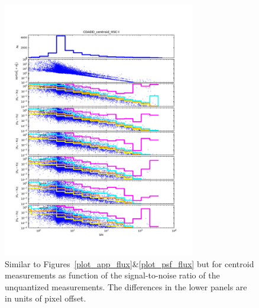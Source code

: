 \begin{figure}
\centering
\includegraphics[width=0.75\textwidth]{figure/plot_coadd_centroid_HSC-I.png}
\caption{Similar to Figures~\ref{plot_app_flux}\&\ref{plot_psf_flux} but for centroid measurements as function of the signal-to-noise ratio
of the unquantized measurements.  The differences in the lower panels are in units of pixel offset.}
\label{coadd_cen}
\end{figure}


